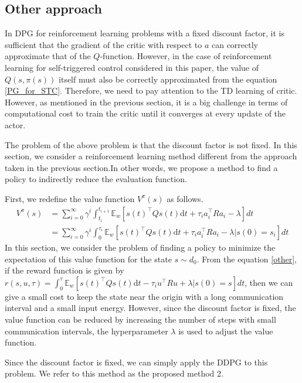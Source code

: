 \documentclass[english, dvipdfmx]{ampmt}             %
\newcommand{\expect}{\mathbb{E}}
\begin{document}
\subsection{Other approach}
\label{sec:other_approach}
In DPG for reinforcement learning problems with a fixed discount factor, it is sufficient that the gradient of the critic with respect to $a$ can correctly approximate that of the $Q$-function. However, in the case of reinforcement learning for self-triggered control considered in this paper, the value of $Q(s,\pi(s))$ itself must also be correctly approximated from the equation \eqref{PG_for_STC}. Therefore, we need to pay attention to the TD learning of critic. However, as mentioned in the previous section, it is a big challenge in terms of computational cost to train the critic until it converges at every update of the actor. \par
The problem of the above problem is that the discount factor is not fixed. In this section, we consider a reinforcement learning method different from the approach taken in the previous section.In other words, we propose a method to find a policy to indirectly reduce the evaluation function.\par 
First, we redefine the value function $V^{\pi}(s)$ as follows.
\begin{align}
	V^{\pi}(s) &= \sum_{i=0}^{\infty}\gamma^i\int_{t_i}^{t_{i+1}}\expect_w[s(t)^{\top}Qs(t)\textrm{d}t + \tau_ia_i^{\top}Ra_i-\lambda] dt \nonumber \\
	&=  \sum_{i=0}^{\infty}\gamma^i\int_0^{\tau_i}\expect_w[s(t)^{\top}Qs(t)\textrm{d}t + \tau_ia_i^{\top}Ra_i-\lambda|s(0) = s_i] dt\label{other}
\end{align}
In this section, we consider the problem of finding a policy to minimize the expectation of this value function for the state $s\sim d_0$. From the equation \eqref{other}, if the reward function is given by $r(s,u,\tau) = \int_0^{\tau}\expect_w[s(t)^{\top}Qs(t)\textrm{d}t - \tau_iu^{\top}Ru+\lambda|s(0) = s] dt$, then we can give a small cost to keep the state near the origin with a long communication interval and a small input energy. However, since the discount factor is fixed, the value function can be reduced by increasing the number of steps with small communication intervals, the hyperparameter $\lambda$ is used to adjust the value function.  \par
Since the discount factor is fixed, we can simply apply the DDPG to this problem. We refer to this method as the proposed method 2.
\fi
\end{document}
